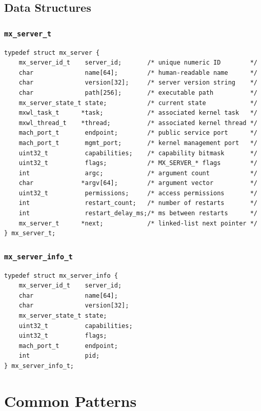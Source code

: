 \documentclass[a4paper,11pt]{article}
\begin{document}
\subsection{Data Structures}

\subsubsection{\texttt{mx\_server\_t}}

\begin{lstlisting}
typedef struct mx_server {
    mx_server_id_t    server_id;       /* unique numeric ID        */
    char              name[64];        /* human-readable name      */
    char              version[32];     /* server version string    */
    char              path[256];       /* executable path          */
    mx_server_state_t state;           /* current state            */
    mxwl_task_t      *task;            /* associated kernel task   */
    mxwl_thread_t    *thread;          /* associated kernel thread */
    mach_port_t       endpoint;        /* public service port      */
    mach_port_t       mgmt_port;       /* kernel management port   */
    uint32_t          capabilities;    /* capability bitmask       */
    uint32_t          flags;           /* MX_SERVER_* flags        */
    int               argc;            /* argument count           */
    char             *argv[64];        /* argument vector          */
    uint32_t          permissions;     /* access permissions       */
    int               restart_count;   /* number of restarts       */
    int               restart_delay_ms;/* ms between restarts      */
    mx_server_t      *next;            /* linked-list next pointer */
} mx_server_t;
\end{lstlisting}

\subsubsection{\texttt{mx\_server\_info\_t}}

\begin{lstlisting}
typedef struct mx_server_info {
    mx_server_id_t    server_id;
    char              name[64];
    char              version[32];
    mx_server_state_t state;
    uint32_t          capabilities;
    uint32_t          flags;
    mach_port_t       endpoint;
    int               pid;
} mx_server_info_t;
\end{lstlisting}

\section{Common Patterns}
\end{document}
